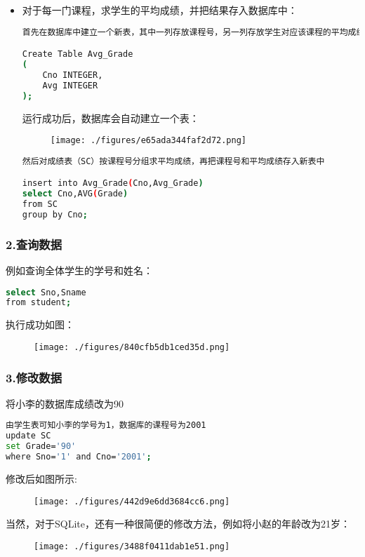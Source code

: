 \begin{itemize}
\item 对于每一门课程，求学生的平均成绩，并把结果存入数据库中：
\begin{lstlisting}[language=bash]
首先在数据库中建立一个新表，其中一列存放课程号，另一列存放学生对应该课程的平均成绩

Create Table Avg_Grade
(
    Cno INTEGER,
    Avg INTEGER
);

\end{lstlisting}
运行成功后，数据库会自动建立一个表：
\begin{figure}[ht]
\centering
\texttt{[image: ./figures/e65ada344faf2d72.png]}
\caption{} \label{fig_SQLint_18}
\end{figure}

\begin{lstlisting}[language=bash]
然后对成绩表（SC）按课程号分组求平均成绩，再把课程号和平均成绩存入新表中

insert into Avg_Grade(Cno,Avg_Grade)
select Cno,AVG(Grade)
from SC
group by Cno;
\end{lstlisting}
\end{itemize}





\subsubsection{2.查询数据}
例如查询全体学生的学号和姓名：
\begin{lstlisting}[language=bash]
select Sno,Sname
from student;
\end{lstlisting}

执行成功如图：
\begin{figure}[ht]
\centering
\texttt{[image: ./figures/840cfb5db1ced35d.png]}
\caption{} \label{fig_SQLint_14}
\end{figure}

\subsubsection{3.修改数据}
将小李的数据库成绩改为90
\begin{lstlisting}[language=bash]
由学生表可知小李的学号为1，数据库的课程号为2001
update SC
set Grade='90'
where Sno='1' and Cno='2001';
\end{lstlisting}
修改后如图所示:
\begin{figure}[ht]
\centering
\texttt{[image: ./figures/442d9e6dd3684cc6.png]}
\caption{} \label{fig_SQLint_15}
\end{figure}
当然，对于SQLite，还有一种很简便的修改方法，例如将小赵的年龄改为21岁：
\begin{figure}[ht]
\centering
\texttt{[image: ./figures/3488f0411dab1e51.png]}
\caption{} \label{fig_SQLint_16}
\end{figure}





